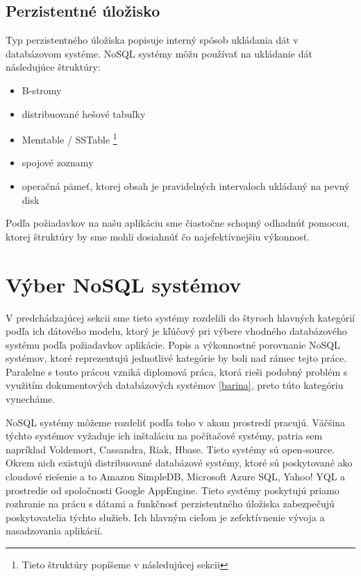 \documentclass[11pt,twoside,a4paper]{book}
\begin{document}
\subsection{Perzistentné úložisko}
Typ perzistentného úložiska popisuje interný spôsob ukládania dát v databázovom systéme. NoSQL systémy môžu používať na ukládanie dát následujúce štruktúry: 
\begin{itemize}
 \item B-stromy
 \item distribuované hešové tabuľky
 \item Memtable / SSTable \footnote{Tieto štruktúry popíšeme v následujúcej sekcii}
 \item spojové zoznamy
 \item operačná pämeť, ktorej obsah je pravidelných intervaloch ukládaný na pevný disk
\end{itemize}
 
Podľa požiadavkov na našu aplikáciu sme čiastočne schopný odhadnúť pomocou, ktorej štruktúry by sme mohli dosiahnúť čo najefektívnejšiu výkonnosť.



\section{Výber NoSQL systémov}

V predchádzajúcej sekcii sme tieto systémy rozdelili do štyroch hlavných kategórií podľa ich dátového modelu, ktorý je kľúčový pri výbere vhodného databázového systému podľa požiadavkov aplikácie. Popis a výkonnostné porovnanie NoSQL systémov, ktoré reprezentujú jednotlivé kategórie by boli nad rámec tejto práce. Paralelne s touto prácou vzniká diplomová práca, ktorá rieši podobný problém s využitím dokumentových databázových systémov  \ref{barina}, preto túto kategóriu vynecháme.

NoSQL systémy môžeme rozdeliť podľa toho v akom prostredí pracujú. Väčšina týchto systémov vyžaduje ich inštaláciu na počítačové systémy, patria sem napríklad Voldemort, Cassandra, Riak, Hbase. Tieto systémy sú open-source. Okrem nich existujú distribuované databázové systémy, ktoré sú poskytované ako cloudové riešenie a to Amazon SimpleDB,  Microsoft Azure SQL, Yahoo! YQL a prostredie od spoločnosti Google AppEngine. Tieto systémy poskytujú priamo rozhranie na prácu s dátami a funkčnosť perzistentného úložiska zabezpečujú poskytovatelia týchto služieb. Ich hlavným cieľom je zefektívnenie vývoja a nasadzovania aplikácií.
\end{document}

